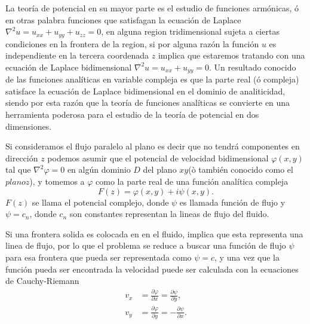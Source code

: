 \documentclass[12pt]{article}
\begin{document}
	\noindent La teoría de potencial	en su mayor parte es el estudio de funciones armónicas, ó en otras palabra funciones que satisfagan la ecuación de Laplace $\nabla^2u = u_{xx} + u_{yy} + u_{zz}= 0 $, en alguna region tridimensional sujeta a ciertas condiciones en la frontera de la region, si por alguna razón la función $u$ es independiente en la tercera coordenada $z$ implica que estaremos tratando con una ecuación de Laplace bidimensional $\nabla^2u = u_{xx} + u_{yy} =0$. Un resultado conocido de las funciones analíticas en variable compleja es que la parte real (ó compleja) satisface la ecuación de Laplace bidimensional en el dominio de analiticidad, siendo por esta razón que la teoría de funciones analíticas se convierte en una herramienta poderosa para el estudio de la teoría de potencial en dos dimensiones.    

	\noindent Si consideramos el flujo paralelo al plano es decir que no tendrá componentes en dirección $z$ podemos asumir que el potencial de velocidad bidimensional  $\varphi(x,y)$ tal que $\nabla^2 \varphi =0 $ en algún dominio $D$ del plano $xy$(ò también conocido como el $plano z$), y tomemos a $\varphi$ como la parte real de una función analítica compleja
	\begin{equation}
		F(z)=\varphi (x,y)	+ i \psi(x,y).
	\end{equation}
	$F(z)$ se llama el potencial complejo, donde $\psi$ es llamada  función de flujo y $\psi = c_n$, donde $c_n$ son constantes representan la lineas de flujo del fluido.
	

	Si una frontera solida es colocada en en el fluido, implica que esta representa una linea de flujo, por lo que el problema se reduce  a buscar una función de flujo $\psi$ para esa frontera que pueda ser representada como $\psi=c$, y una vez que la función pueda ser encontrada la velocidad puede ser calculada con la ecuaciones de Cauchy-Riemann
	\begin{equation}
		\begin{split}
			v_x &= \frac{\partial \varphi}{\partial x} = \frac{\partial \psi}{\partial y }, \\
			v_y &= \frac{\partial \varphi}{\partial y} =- \frac{\partial \psi}{\partial x }. \\
		\end{split}
	\end{equation}
	
\end{document}
